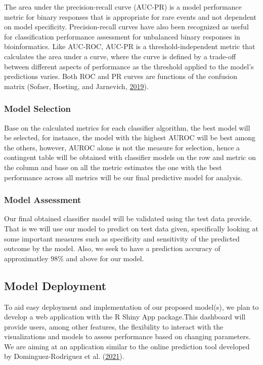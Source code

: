 \documentclass[
  10pt,
]{article}
\begin{document}
The area under the precision-recall curve (AUC-PR) is a model performance metric for binary responses that is appropriate for rare events and not dependent on model specificity. Precision-recall
curves have also been recognized as useful for classification performance assessment for unbalanced binary responses in bioinformatics. Like AUC-ROC, AUC-PR is a threshold-independent metric that calculates the area under a curve, where the curve is defined by a trade-off between different aspects of performance as the threshold applied to the model's predictions varies. Both ROC and PR curves are functions of the confusion matrix (Sofaer, Hoeting, and Jarnevich, \protect\hyperlink{ref-sofaer2019area}{2019}).

\hypertarget{model-selection}{%
\subsubsection{Model Selection}\label{model-selection}}

Base on the calculated metrics for each classifier algorithm, the best model will be selected, for instance, the model with the highest AUROC will be best among the others, however, AUROC alone is not the measure for selection, hence a contingent table will be obtained with classifier models on the row and metric on the column and base on all the metric estimates the one with the best performance across all metrics will be our final predictive model for analysis.

\hypertarget{model-assessment}{%
\subsubsection{Model Assessment}\label{model-assessment}}

Our final obtained classifier model will be validated using the test data provide. That is we will use our model to predict on test data given, specifically looking at some important measures such as specificity and sensitivity of the predicted outcome by the model. Also, we seek to have a prediction accuracy of approximatley 98\% and above for our model.

\hypertarget{model-deployment}{%
\subsection{Model Deployment}\label{model-deployment}}

To aid easy deployment and implementation of our proposed model(s), we plan to develop a web application with the R Shiny App package.This dashboard will provide users, among other features, the flexibility to interact with the visualizations and models to assess performance based on changing parameters. We are aiming at an application similar to the online prediction tool developed by Dominguez-Rodriguez et al. (\protect\hyperlink{ref-dominguez2021bayesian}{2021}).
\end{document}
